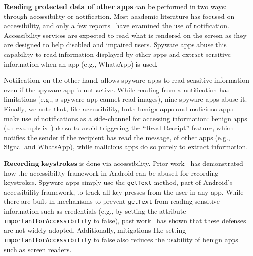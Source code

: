 \documentclass[sigconf,balance=false]{acmart}
\newcommand{\alex}[1]{\textcolor{chicagomaroon}{\noindent[AL: #1]}}
\newcommand{\damon}[1]{\textcolor{blue}{\noindent[DM: #1]}}
\newcommand{\geoff}[1]{\textcolor{purple}{\noindent[GV: #1]}}
\newcommand{\alex}[1]{}
\newcommand{\geoff}[1]{}
\newcommand{\damon}[1]{}
\begin{document}
\textbf{Reading protected data of other apps} can be performed in two ways: through
accessibility or notification. Most academic literature has focused on
accessibility, and only a few reports~\cite{VB2019Za6:online} have examined the
use of notification. Accessibility services are expected to read what is
rendered on the screen as they are designed to help disabled and impaired users.
Spyware apps abuse this capability to read information displayed by other apps
and extract sensitive information when an app (e.g., WhatsApp) is used.

Notification, on the other hand, allows spyware apps to read sensitive
information even if the spyware app is not active. While reading from a notification has
limitations (e.g., a spyware app cannot read images), nine spyware apps abuse it.
Finally, we note that, like accessibility, both benign apps and malicious apps
make use of notifications as a side-channel for accessing information: benign
apps (an example is~\cite{ReadUnre55:online}) do so to avoid triggering the ``Read Receipt'' feature, which notifies the
sender if the recipient has read the message,
of other apps (e.g., Signal and WhatsApp), while malicious apps do so
purely to extract information.

\textbf{Recording keystrokes} is done via accessibility. Prior
work~\cite{fratantonio2017cloak,jang2014a11y,naseri2019accessileaks} has
demonstrated how the accessibility framework in Android can be abused for
recording keystrokes.
Spyware apps simply use the \texttt{getText} method, part
of Android's accessibility framework, to track all key presses from the user in
any app.
While there are built-in mechanisms to prevent \texttt{getText} from
reading sensitive information such as credentials (e.g., by setting
the attribute
\texttt{importantForAccessibility} to false), past
work~\cite{naseri2019accessileaks} has shown that these defenses are not
widely adopted. Additionally, mitigations like setting \texttt{importantForAccessibility} to
false also reduces the usability of benign apps such as screen readers.

\end{document}
